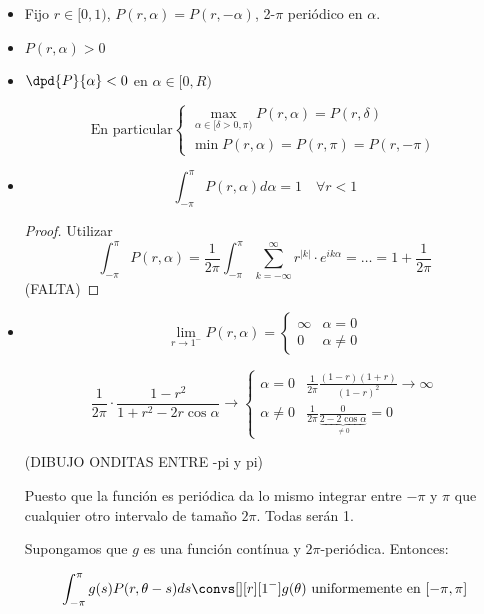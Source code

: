 		\begin{itemize}

			\item Fijo $r \in [0,1)$, $P(r,\alpha) = P(r,-\alpha)$, 2-$\pi$ periódico en $\alpha$.

			\item $P(r,\alpha) > 0$

			\item $\dpd{P}{\alpha} < 0$ en $\alpha \in [0,R)$

			\[ \text{En particular} \begin{cases}
				\max_{\alpha \in [\delta > 0, \pi)} P(r,\alpha) = P(r,\delta) \\
				\min P(r,\alpha) = P(r,\pi) = P(r,-\pi)
			\end{cases} \]

			\item \[
				\int_{-\pi}^\pi P(r, \alpha) d\alpha = 1 \quad \forall r < 1
			\]

			\begin{proof}
				Utilizar \[ \int_{-\pi}^\pi P(r, \alpha) = \frac{1}{2\pi} \int_{-\pi}^\pi \sum_{k=-\infty}^{\infty} r^{|k|} \cdot e^{ik\alpha}  = … = 1 + \frac{1}{2\pi}  \]
				(FALTA)
			\end{proof}


			\item \[
			\lim_{r \to 1^-} P(r, \alpha) = \begin{cases}
				\infty & \alpha = 0 \\
				0 & \alpha \neq 0
			\end{cases}
			\]

			\[
				\frac{1}{2\pi} \cdot \frac{1-r^2}{1+r^2-2r\cos \alpha} \rightarrow \begin{cases}
				\alpha = 0 & \frac{1}{2\pi} \frac{(1-r)(1+r)}{(1-r)^2} \rightarrow \infty \\
				\alpha \neq 0  & \frac{1}{2\pi} \frac{0}{\underbrace{2-2\cos \alpha}_{\neq 0}} = 0
				\end{cases}
			\]

			(DIBUJO ONDITAS ENTRE -pi y pi)

			Puesto que la función es periódica da lo mismo integrar entre $-\pi$ y $\pi$ que cualquier otro intervalo de tamaño $2\pi$. Todas serán 1.

			\begin{theorem}
				Supongamos que $g$ es una función contínua y $2\pi$-periódica. Entonces:

				\[ \int^\pi_{-\pi} g(s)P(r, \theta-s) ds \convs[][r][1^-] g(\theta) \text{ uniformemente en } [-\pi,\pi] \]


\end{theorem}
\end{itemize}
